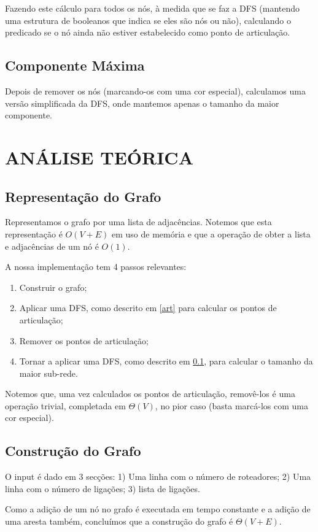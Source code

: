 \documentclass[a4paper, 12pt, conference, portuguese]{ieeeconf}
\begin{document}
Fazendo este cálculo para todos os nós, à medida que se faz a DFS (mantendo uma
estrutura de booleanos que indica se eles são nós ou não), calculando o
predicado se o nó ainda não estiver estabelecido como ponto de articulação.

\subsection{Componente Máxima}\label{dfs}
Depois de remover os nós (marcando-os com uma cor especial), calculamos uma
versão simplificada da DFS, onde mantemos apenas o tamanho da maior componente.

\section{ANÁLISE TEÓRICA}\label{theoric}
\subsection{Representação do Grafo}
Representamos o grafo por uma lista de adjacências. Notemos que esta
representação é $O(V + E)$ \cite{cormen} em uso de memória e que a operação de obter a lista
e adjacências de um nó é $O(1)$.

A nossa implementação tem 4 passos relevantes:
\begin{enumerate}
  \item
    Construir o grafo;
  \item
    Aplicar uma DFS, como descrito em \ref{art} para calcular os pontos de
    articulação;
  \item
    Remover os pontos de articulação;
  \item
    Tornar a aplicar uma DFS, como descrito em \ref{dfs}, para calcular o
    tamanho da maior sub-rede.
\end{enumerate}

Notemos que, uma vez calculados os pontos de articulação, removê-los é uma
operação trivial, completada em $\Theta(V)$, no pior caso (basta marcá-los com uma
cor especial).

\subsection{Construção do Grafo}
O input é dado em $3$ secções: 1) Uma linha com o número de roteadores; 2) Uma
linha com o número de ligações; 3) lista de ligações.

Como a adição de um nó no grafo é executada em tempo constante e a adição de uma
aresta também, concluímos que a construção do grafo é $\Theta(V + E)$.
\end{document}
